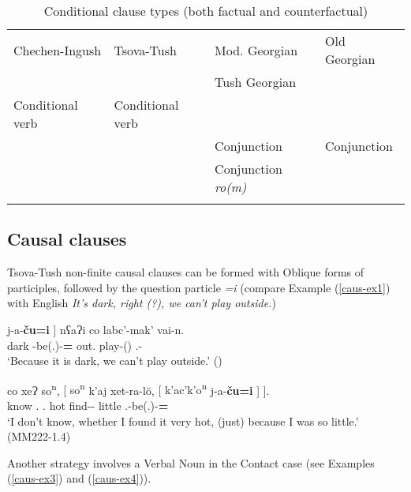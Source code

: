 \begin{table}
	\begin{tabular}{llll}
    \lsptoprule
		{Chechen-Ingush}  & {Tsova-Tush} & {Mod. Georgian} &  {Old Georgian} \\
		                        &                      & {Tush Georgian} & \\
		\midrule
		Conditional verb & Conditional verb &  &  \\
		& & Conjunction & Conjunction \\
		& & Conjunction \textit{ro(m)} & \\
        \lspbottomrule
	\end{tabular}
	\caption{Conditional clause types (both factual and counterfactual)}
	\label{cond-table1}
\end{table}


\subsection{Causal clauses}\label{caus}


Tsova-Tush non-finite causal clauses can be formed with Oblique forms of participles, followed by the question particle \textit{=i} (compare Example (\ref{caus-ex1}) with English \textit{It’s dark, right (?), we can’t play outside.})


	\begin{exe}
		\ex\label{caus-ex1}
		\gll {{\normalfont[} uči\textsuperscript{n}}	{j-a-\textbf{ču=i} {\normalfont]}}	nʕaɁi	co	labc'-mak'	vai-n.  \\
		dark	{\J}-be({\Ptcp}.{\Npst})-\textbf{{\Obl}={\Q}}	out.{\Ess}	{\Neg}	play-{\Pot}({\Npst})	{\Fpl}.{\Incl}-{\Dat}    \\
		\trans `Because it is dark, we can’t play outside.’ 
		\hfill (\cite[204]{holiskygagua})

		\ex\label{caus-ex2}
		\gll co	xeɁ	so\textsuperscript{n},	{{\normalfont[} so\textsuperscript{n}}	k'aj	xet-ra-l\u{o},	{{\normalfont[} k'ac'k'o\textsuperscript{n}}	{j-a-\textbf{ču=i} {\normalfont] ]}}. \\
		{\Neg}	know	{\Fsg}.{\Dat}	{\Fsg}.{\Dat}	hot	find-{\Imprf}-{\Sbjv}	little	{\F}.{\Sg}-be({\Ptcp}.{\Npst})-\textbf{{\Obl}={\Q}}   \\
		\trans `I don’t know, whether I found it very hot, (just) because I was so little.’	 \\
		\hfill (MM222-1.4)
	\end{exe}


Another strategy involves a Verbal Noun in the Contact case (see Examples (\ref{caus-ex3}) and (\ref{caus-ex4})).


